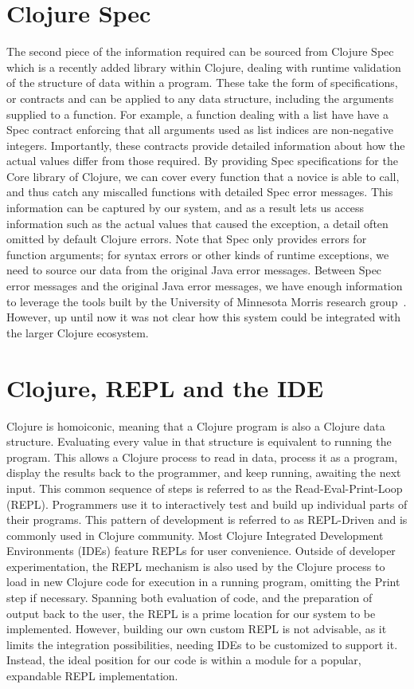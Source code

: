 \documentclass[12pt]{article}
\newcommand{\comment}[1]{{\bf \tt  {#1}}}
\begin{document}
\section{Clojure Spec}
The second piece of the information required can be sourced from Clojure Spec~\cite{spec}
which is a recently added library within Clojure, dealing with runtime validation of
the structure of data within a program. These take the form of specifications, or contracts
and can be applied to any data structure, including the arguments supplied to a function.
 For example, a function dealing with a list have have a Spec contract enforcing that all arguments
 used as list indices are non-negative integers.
Importantly, these contracts provide detailed information
 about how the actual values differ from those required.
By providing Spec specifications for the Core library of Clojure,
 we can cover every function that a novice is able to call, and thus catch
 any miscalled functions with detailed Spec error messages.
 This information can be captured by our system, and as a result
 lets us access information such as the actual values that caused the exception,
 a detail often omitted by default Clojure errors.
Note that Spec only provides errors for function arguments; for syntax errors or other kinds of
runtime exceptions, we need to source our data from the original Java error messages.
Between Spec error messages and the original Java error messages, we have enough
information to leverage the tools built by the
 University of Minnesota Morris research group~\cite{mics2017}. 
However, up until now it was not clear how this system could be integrated with the larger Clojure ecosystem.

\section{Clojure, REPL and the IDE}
Clojure is homoiconic, meaning that a Clojure program is also a Clojure data structure.
 Evaluating every value in that structure is
equivalent to running the program.
This allows a Clojure process to read in data, process it as a program, display the results
 back to the programmer, and keep running, awaiting the next input.
 This common sequence of steps is referred to
as the Read-Eval-Print-Loop (REPL). Programmers use it to interactively test and build up
individual parts of their programs. This pattern of development is
referred to as REPL-Driven and is commonly used in Clojure community.
 Most Clojure Integrated Development Environments (IDEs) feature REPLs for
 user convenience. Outside of developer experimentation, the REPL mechanism is also used
by the Clojure process to load in new Clojure code for execution in a running program,
omitting the Print step if necessary.
Spanning both evaluation of code, and the preparation of output back to the user,
the REPL is a prime location for our system to be implemented.
However, building our own custom REPL is not advisable, as it limits the
integration possibilities, needing IDEs to be customized to support it.
Instead, the ideal position for our code is within a module
 for a popular, expandable REPL implementation.
\end{document}
